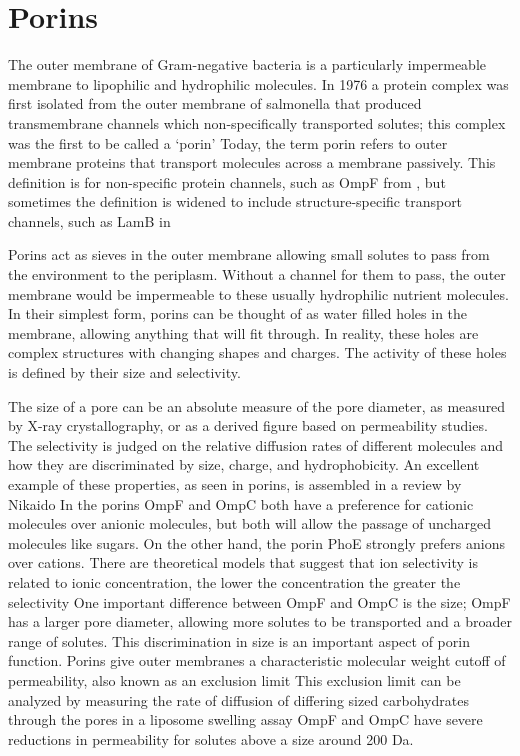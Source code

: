   \section{Porins} \label{sec:intro-porins}
 
The outer membrane of Gram-negative bacteria is a particularly impermeable membrane to lipophilic and hydrophilic molecules. In 1976 a protein complex was first isolated from the
outer membrane of \ac{salmonella} that produced transmembrane channels which non-specifically transported solutes; this complex was the first to be called a
`porin' Today, the term porin refers to outer membrane proteins that transport molecules across a membrane passively. This definition is for non-specific
protein channels, such as OmpF from \ecoli{}, but sometimes the definition is widened to include structure-specific transport channels, such as LamB
in \ecoli{}

Porins act as sieves in the outer membrane allowing small solutes to pass from the environment to the periplasm. Without a channel for them to pass, the outer membrane would be
impermeable to these usually hydrophilic nutrient molecules. In their simplest form, porins can be thought of as water filled holes in the membrane, allowing anything that will fit
through. In reality, these holes are complex structures with changing shapes and charges. The activity of these holes is defined by their size and selectivity.

The size of a pore can be an absolute measure of the pore diameter, as measured by X-ray crystallography, or as a derived figure based on permeability studies. The selectivity is
judged on the relative diffusion rates of different molecules and how they are discriminated by size, charge, and hydrophobicity. An excellent example of these properties, as seen
in \ecoli{} porins, is assembled in a review by Nikaido In \ecoli{} the porins OmpF and OmpC both have a preference for cationic molecules over
anionic molecules, but both will allow the passage of uncharged molecules like sugars. On the other hand, the \ecoli{} porin PhoE strongly prefers anions over cations. There are
theoretical models that suggest that ion selectivity is related to ionic concentration, the lower the concentration the greater the selectivity One important
difference between OmpF and OmpC is the size; OmpF has a larger pore diameter, allowing more solutes to be transported and a broader range of solutes. This discrimination in size
is an important aspect of porin function. Porins give outer membranes a characteristic molecular weight cutoff of permeability, also known as an exclusion
limit This exclusion limit can be analyzed by measuring the rate of diffusion of differing sized carbohydrates through the pores in a liposome swelling
assay OmpF and OmpC have severe reductions in permeability for solutes above a size around 200 Da.
 
